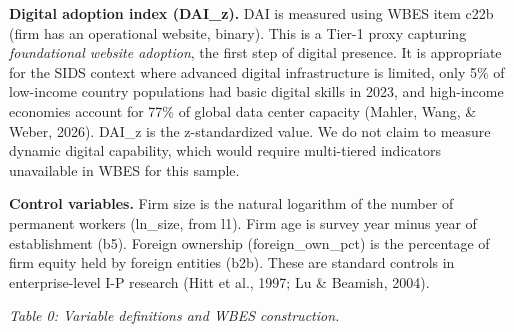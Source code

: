 \documentclass[12pt,a4paper]{article}
\begin{document}
\textbf{Digital adoption index (DAI\_z).} DAI is measured using WBES
item c22b (firm has an operational website, binary). This is a Tier-1
proxy capturing \emph{foundational website adoption}, the first step of
digital presence. It is appropriate for the SIDS context where advanced
digital infrastructure is limited, only 5\% of low-income country
populations had basic digital skills in 2023, and high-income economies
account for 77\% of global data center capacity (Mahler, Wang, \& Weber,
2026). DAI\_z is the z-standardized value. We do not claim to measure
dynamic digital capability, which would require multi-tiered indicators
unavailable in WBES for this sample.

\textbf{Control variables.} Firm size is the natural logarithm of the
number of permanent workers (ln\_size, from l1). Firm age is survey year
minus year of establishment (b5). Foreign ownership (foreign\_own\_pct)
is the percentage of firm equity held by foreign entities (b2b). These
are standard controls in enterprise-level I-P research (Hitt et al.,
1997; Lu \& Beamish, 2004).

\emph{Table 0: Variable definitions and WBES construction.}
\end{document}
